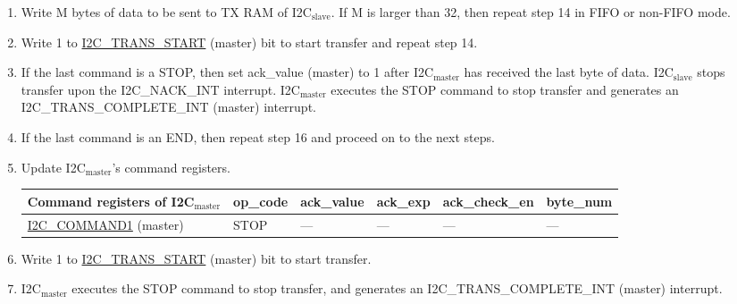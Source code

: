 \documentclass[main\_\_EN.tex]{subfiles}
\begin{document}
\begin{enumerate}
\item Write M bytes of data to be sent to TX RAM of I2C$_\text{slave}$. If M is larger than 32, then repeat step 14 in FIFO or non-FIFO mode.
\item Write 1 to \hyperref[fielddesc:I2CTRANSSTART]{I2C\_TRANS\_START} (master) bit to start transfer and repeat step 14.
\item If the last command is a STOP, then set ack\_value (master) to 1 after I2C$_\text{master}$ has received the last byte of data. I2C$_\text{slave}$ stops transfer upon the I2C\_NACK\_INT interrupt. I2C$_\text{master}$ executes the STOP command to stop transfer and generates an I2C\_TRANS\_COMPLETE\_INT (master) interrupt.
\item If the last command is an END, then repeat step 16 and proceed on to the next steps.
\item Update I2C$_\text{master}$'s command registers.
\begin{longtable}{ | p{4cm} | p{2cm} | p{2cm} | p{2cm} |p{2cm} | p{2cm} |}
\hline\rowcolor{lightgray}
Command registers of I2C$_\text{master}$& op\_code & ack\_value&ack\_exp&ack\_check\_en&byte\_num  \\ \hline
\hyperref[fielddesc:I2CCOMMAND1]{I2C\_COMMAND1} (master)& STOP& ---&---&---&---  \\ \hline
\end{longtable}
\item Write 1 to \hyperref[fielddesc:I2CTRANSSTART]{I2C\_TRANS\_START} (master) bit to start transfer.
\item I2C$_\text{master}$ executes the STOP command to stop transfer, and generates an I2C\_TRANS\_COMPLETE\_INT (master) interrupt.

\end{enumerate}
\end{document}
